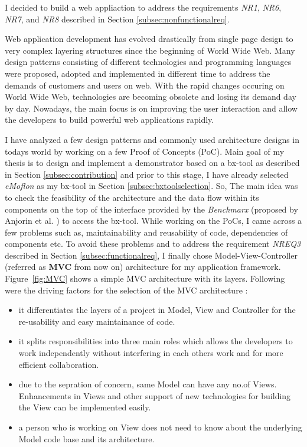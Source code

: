 I decided to build a web appliaction to address the requirements \textit{NR1}, \textit{NR6}, \textit{NR7}, and \textit{NR8} described in Section \ref{subsec:nonfunctionalreq}.

Web application development has evolved drastically from single page design to very complex layering structures since the beginning of World Wide Web. Many design patterns \cite{designpattern} \cite{designpattern-notes} consisting of different technologies and programming languages were proposed, adopted and implemented in different time to address the demands of customers and users on web. With the rapid changes occuring on World Wide Web, technologies are becoming obsolete and losing its demand day by day. Nowadays, the main focus is on improving the user interaction and allow the developers to build powerful web applications rapidly.

I have analyzed a few design patterns and commonly used architecture designs in todays world by working on a few Proof of Concepts (PoC). Main goal of my thesis is to design and implement a demonstrator based on a bx-tool as described in Section \ref{subsec:contribution} and prior to this stage, I have already selected \textit{eMoflon} as my bx-tool in Section \ref{subsec:bxtoolselection}. So, The main idea was to check the feasibility of the architecture and the data flow within its components on the top of the interface provided by the \textit{Benchmarx} (proposed by Anjorin et al. \cite{benchmarx-reload}) to access the bx-tool. While working on the PoCs, I came across a few problems such as, maintainability and reusability of code, dependencies of components etc. To avoid these problems and to address the requirement \textit{NREQ3} described in Section \ref{subsec:functionalreq}, I finally chose Model-View-Controller (referred as \textbf{MVC} from now on) architecture for my application framework. Figure~\ref{fig:MVC} shows a simple MVC architecture with its layers. Following were the driving factors for the selection of the MVC architecture \cite{designpattern-notes} \cite{designpattern-headfirst} :
\begin{itemize}
	\item {it differentiates the layers of a project in Model, View and Controller for the re-usability and easy maintainance of code.}
	\item {it splits responsibilities into three main roles which allows the developers to work independently without interfering in each others work and for more efficient collaboration.}
	\item {due to the sepration of concern, same Model can have any no.of Views. Enhancements in Views and other support of new technologies for building the View can be implemented easily.}
	\item {a person who is working on View does not need to know about the underlying Model code base and its architecture.}
\end{itemize}

